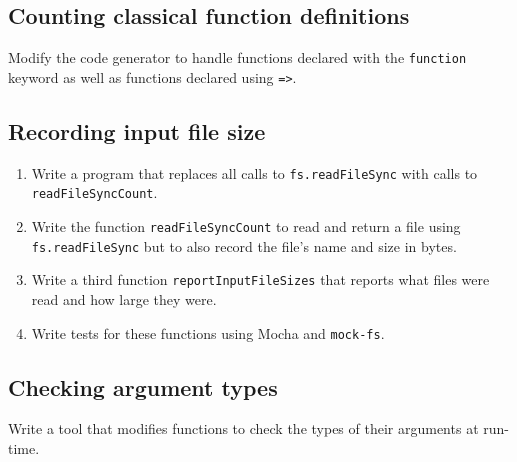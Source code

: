 \documentclass[krantzl]{krantz}
\begin{document}
\subsection*{Counting classical function definitions}


Modify the code generator to handle functions declared with the \texttt{function} keyword
as well as functions declared using \texttt{=>}.

\subsection*{Recording input file size}

\begin{enumerate}

\item 

Write a program that replaces all calls to \texttt{fs.readFileSync}
    with calls to \texttt{readFileSyncCount}.



\item 

Write the function \texttt{readFileSyncCount} to read and return a file using \texttt{fs.readFileSync}
    but to also record the file’s name and size in bytes.



\item 

Write a third function \texttt{reportInputFileSizes} that reports
    what files were read and how large they were.



\item 

Write tests for these functions using Mocha and \texttt{mock-fs}.



\end{enumerate}

\subsection*{Checking argument types}


Write a tool that modifies functions to check the types of their arguments at run-time.
\end{document}
